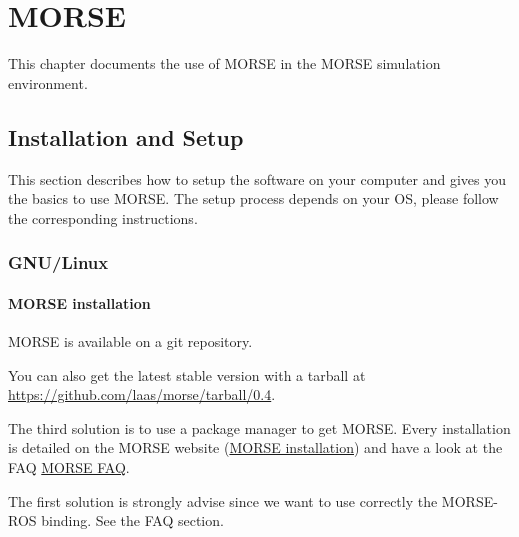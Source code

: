 
\chapter{MORSE}
\label{sec:morse}

This chapter documents the use of MORSE in the MORSE simulation
environment.

\section{Installation and Setup}

This section describes how to setup the software on your computer and gives
you the basics to use MORSE.  The setup process depends on your OS, please
follow the corresponding instructions.

\subsection{GNU/Linux}

\subsubsection{MORSE installation}

MORSE is available on a git repository.


You can also get the latest stable version with a tarball at
\href{https://github.com/laas/morse/tarball/0.4}
{https://github.com/laas/morse/tarball/0.4}.

The third solution is to use a package manager to get MORSE.  Every
installation is detailed on the MORSE website
(\href{http://www.openrobots.org/morse/doc/latest/user/installation.html}
{MORSE installation}) and have a look at the FAQ
\href{http://www.openrobots.org/morse/doc/latest/user/faq.html} {MORSE FAQ}.

The first solution is strongly advise since we want to use correctly the
MORSE-ROS binding. See the FAQ section. %

